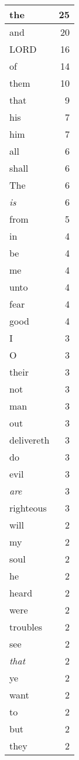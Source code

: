 \begin{center}
\begin{longtable}{l|r}
\hline \hline
\endlastfoot
the & 25 \\ \hline
and & 20 \\ \hline
LORD & 16 \\ \hline
of & 14 \\ \hline
them & 10 \\ \hline
that & 9 \\ \hline
his & 7 \\ \hline
him & 7 \\ \hline
all & 6 \\ \hline
shall & 6 \\ \hline
The & 6 \\ \hline
\emph{is} & 6 \\ \hline
from & 5 \\ \hline
in & 4 \\ \hline
be & 4 \\ \hline
me & 4 \\ \hline
unto & 4 \\ \hline
fear & 4 \\ \hline
good & 4 \\ \hline
I & 3 \\ \hline
O & 3 \\ \hline
their & 3 \\ \hline
not & 3 \\ \hline
man & 3 \\ \hline
out & 3 \\ \hline
delivereth & 3 \\ \hline
do & 3 \\ \hline
evil & 3 \\ \hline
\emph{are} & 3 \\ \hline
righteous & 3 \\ \hline
will & 2 \\ \hline
my & 2 \\ \hline
soul & 2 \\ \hline
he & 2 \\ \hline
heard & 2 \\ \hline
were & 2 \\ \hline
troubles & 2 \\ \hline
see & 2 \\ \hline
\emph{that} & 2 \\ \hline
ye & 2 \\ \hline
want & 2 \\ \hline
to & 2 \\ \hline
but & 2 \\ \hline
they & 2 \\ \hline

\end{longtable}
\end{center}

